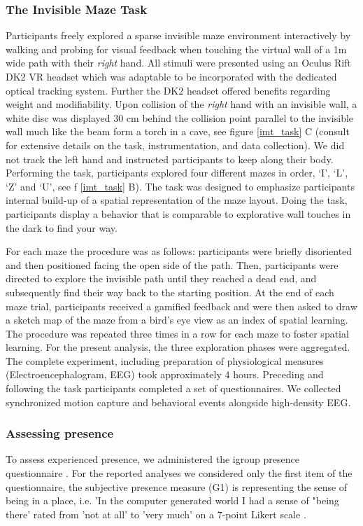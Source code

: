 \subsubsection{The Invisible Maze Task} Participants freely explored a sparse invisible maze environment interactively by walking and probing for visual feedback when touching the virtual wall of a 1m wide path with their \textit{right} hand. All stimuli were presented using an Oculus Rift DK2 VR headset which was adaptable to be incorporated with the dedicated optical tracking system. Further the DK2 headset offered benefits regarding weight and modifiability. Upon collision of the \textit{right} hand with an invisible wall, a white disc was displayed 30 cm behind the collision point parallel to the invisible wall much like the beam form a torch in a cave, see figure \ref{imt_task} C (consult \cite{} for extensive details on the task, instrumentation, and data collection). We did not track the left hand and instructed participants to keep along their body. Performing the task, participants explored four different mazes in order, `I', `L', `Z' and `U', see f \ref{imt_task} B). The task was designed to emphasize participants internal build-up of a spatial representation of the maze layout. Doing the task, participants display a behavior that is comparable to explorative wall touches in the dark to find your way.

For each maze the procedure was as follows: participants were briefly disoriented and then positioned facing the open side of the path. Then, participants were directed to explore the invisible path until they reached a dead end, and subsequently find their way back to the starting position. At the end of each maze trial, participants received a gamified feedback and were then asked to draw a sketch map of the maze from a bird’s eye view as an index of spatial learning. The procedure was repeated three times in a row for each maze to foster spatial learning. For the present analysis, the three exploration phases were aggregated. The complete experiment, including preparation of physiological measures (Electroencephalogram, EEG) took approximately 4 hours. Preceding and following the task participants completed a set of questionnaires. We collected synchronized motion capture and behavioral events alongside high-density EEG.

\subsubsection{Assessing presence} To assess experienced presence, we administered the igroup presence questionnaire \cite{Schubert2003}. For the reported analyses we considered only the first item of the questionnaire, the subjective presence measure (G1) is representing the sense of being in a place, i.e. 'In the computer generated world I had a sense of "being there' rated from 'not at all' to 'very much' on a 7-point Likert scale \cite{Schubert2003, Slater1993}.

